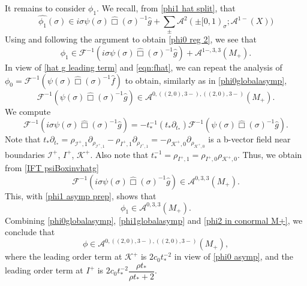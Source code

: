 \documentclass[10pt,a4paper,reqno]{amsart}
\newcommand{\A}{\mathcal{A}}
\newcommand{\pa}{\partial}
\let\pminus\pm
\let\hat\widehat
\renewcommand{\pm}{\phi_{\le m}}
\theoremstyle{definition}
\theoremstyle{remark}
\numberwithin{equation}{section}
\newcommand{\ts}{t_*}
\newcommand{\wh}{\widehat}
\begin{document}
It remains to consider $\phi_1$. We recall, from \eqref{phi1 hat split}, that
\[
    \widehat{\phi_1}(\sigma) \in i\sigma\psi(\sigma)\wh\Box(\sigma)^{-1} \hat{g} + \sum_\pminus \A^{2}(\pminus[0,1)_\sigma;\A^{1-}(X))
\]
Using \cite[Lemma 3.6]{Hin22} and following the argument to obtain \eqref{phi0 reg 2}, we see that
\begin{equation}
\label{phi1 asymp prep}
    \phi_1 \in \mathcal{F}^{-1}(i\sigma\psi(\sigma)\wh\Box(\sigma)^{-1} \hat{g}) + \A^{1-,3,3}(M_+).
\end{equation}
In view of \eqref{hat g leading term} and \eqref{eqn:fhat}, we can repeat the analysis of $\phi_0 = \mathcal{F}^{-1}(\psi(\sigma)\wh\Box(\sigma)^{-1} \hat{f})$ to obtain, similarly as in \eqref{phi0globalasymp},
\begin{equation}
\label{IFT psiBoxinvhatg}
    \mathcal{F}^{-1}(\psi(\sigma)\wh\Box(\sigma)^{-1} \hat{g}) \in \A^{0,((2,0),3-),((2,0),3-)}(M_+).
\end{equation}
We compute
\[
    \mathcal{F}^{-1}(i\sigma\psi(\sigma)\wh\Box(\sigma)^{-1} \hat{g}) = -t_*^{-1} (\ts \pa_{\ts})\mathcal{F}^{-1}(\psi(\sigma)\wh\Box(\sigma)^{-1} \hat{g}).
\]
Note that $\ts \pa_{\ts} = \rho_{\mathscr{I}^+,1}\pa_{\rho_{\mathscr{I}^+,1}} - \rho_{I^+,1}\pa_{\rho_{I^+,1}} = - \rho_{\mathcal{K}^+,0}\pa_{\rho_{\mathcal{K}^+,0}}$ is a b-vector field near boundaries $\mathscr{I}^+$, $I^+$, $\mathcal{K}^+$. Also note that $t_*^{-1} = \rho_{I^+,1} = \rho_{I^+,0}\rho_{\mathcal{K}^+,0}$. Thus, we obtain from \eqref{IFT psiBoxinvhatg}
\[
    \mathcal{F}^{-1}(i\sigma\psi(\sigma)\wh\Box(\sigma)^{-1} \hat{g}) \in \A^{0,3,3}(M_+).
\]
This, with \eqref{phi1 asymp prep}, shows that
\begin{equation}
\label{phi1globalasymp}
    \phi_1 \in \A^{0,3,3}(M_+).
\end{equation}
Combining \eqref{phi0globalasymp}, \eqref{phi1globalasymp} and \eqref{phi2 in conormal M+}, we conclude that
\begin{equation}
\label{globalasymp0}
    \phi \in \A^{0,((2,0),3-),((2,0),3-)}(M_+),
\end{equation}
where the leading order term at $\mathcal{K}^+$ is $2c_0 t_*^{-2}$ in view of \eqref{phi0 asymp}, and the leading order term at $I^+$ is $2c_0 t_*^{-2} \dfrac{\rho t_*}{\rho t_* + 2}.$
\end{document}

